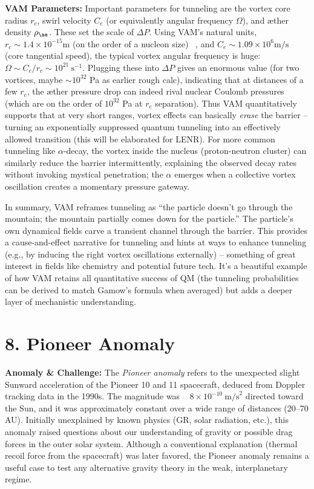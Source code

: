 \documentclass[a4paper, aps,preprint,superscriptaddress, 12pt]{revtex4}
\begin{document}
\textbf{VAM Parameters:} Important parameters for tunneling are the vortex core radius $r_c$, swirl velocity $C_e$ (or equivalently angular frequency $\Omega$), and æther density $\rho_{\ae}$. These set the scale of $\Delta P$. Using VAM’s natural units, $r_c\sim1.4\times10^{-15}\text{m}$ (on the order of a nucleon size)~\cite{VAM_constants} , and $C_e\sim1.09\times10^6\text{m/s}$~\cite{VAM_constants}  (core tangential speed), the typical vortex angular frequency is huge: $\Omega \sim C_e/r_c \sim 10^{21}~\text{s}^{-1}$. Plugging these into $\Delta P$ gives an enormous value (for two vortices, maybe $\sim10^{32}$ Pa as earlier rough calc), indicating that at distances of a few $r_c$, the æther pressure drop can indeed rival nuclear Coulomb pressures (which are on the order of $10^{32}$ Pa at $r_c$ separation). Thus VAM quantitatively supports that at very short ranges, vortex effects can basically \textit{erase} the barrier – turning an exponentially suppressed quantum tunneling into an effectively allowed transition (this will be elaborated for LENR). For more common tunneling like $\alpha$-decay, the vortex inside the nucleus (proton-neutron cluster) can similarly reduce the barrier intermittently, explaining the observed decay rates without invoking mystical penetration; the $\alpha$ emerges when a collective vortex oscillation creates a momentary pressure gateway.


In summary, VAM reframes tunneling as “the particle doesn’t go through the mountain; the mountain partially comes down for the particle.” The particle’s own dynamical fields carve a transient channel through the barrier. This provides a cause-and-effect narrative for tunneling and hints at ways to enhance tunneling (e.g., by inducing the right vortex oscillations externally) – something of great interest in fields like chemistry and potential future tech. It’s a beautiful example of how VAM retains all quantitative success of QM (the tunneling probabilities can be derived to match Gamow’s formula when averaged) but adds a deeper layer of mechanistic understanding.


\section*{8. Pioneer Anomaly}

\textbf{Anomaly \& Challenge: } The \textit{Pioneer anomaly} refers to the unexpected slight Sunward acceleration of the Pioneer 10 and 11 spacecraft, deduced from Doppler tracking data in the 1990s. The magnitude was ~ $8\times10^{-10}~\text{m/s}^2$ directed toward the Sun, and it was approximately constant over a wide range of distances (20–70 AU). Initially unexplained by known physics (GR, solar radiation, etc.), this anomaly raised questions about our understanding of gravity or possible drag forces in the outer solar system. Although a conventional explanation (thermal recoil force from the spacecraft) was later favored, the Pioneer anomaly remains a useful case to test any alternative gravity theory in the weak, interplanetary regime.
\end{document}
